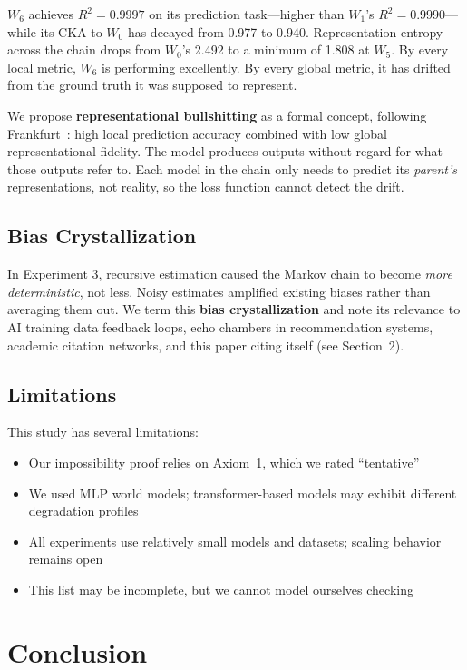 \documentclass[11pt, twocolumn]{article}
\begin{document}
$W_6$ achieves $R^2 = 0.9997$ on its prediction task---higher than $W_1$'s $R^2 = 0.9990$---while its CKA to $W_0$ has decayed from 0.977 to 0.940. Representation entropy across the chain drops from $W_0$'s 2.492 to a minimum of 1.808 at $W_5$. By every local metric, $W_6$ is performing excellently. By every global metric, it has drifted from the ground truth it was supposed to represent.

We propose \textbf{representational bullshitting} as a formal concept, following Frankfurt~\cite{frankfurt2005}: high local prediction accuracy combined with low global representational fidelity. The model produces outputs without regard for what those outputs refer to. Each model in the chain only needs to predict its \textit{parent's} representations, not reality, so the loss function cannot detect the drift.

\subsection{Bias Crystallization}

In Experiment 3, recursive estimation caused the Markov chain to become \textit{more deterministic}, not less. Noisy estimates amplified existing biases rather than averaging them out. We term this \textbf{bias crystallization} and note its relevance to AI training data feedback loops, echo chambers in recommendation systems, academic citation networks, and this paper citing itself (see Section~2).

\subsection{Limitations}

This study has several limitations:
\begin{itemize}[nosep]
    \item Our impossibility proof relies on Axiom~1, which we rated ``tentative''
    \item We used MLP world models; transformer-based models may exhibit different degradation profiles
    \item All experiments use relatively small models and datasets; scaling behavior remains open
    \item This list may be incomplete, but we cannot model ourselves checking
\end{itemize}

\section{Conclusion}
\end{document}
